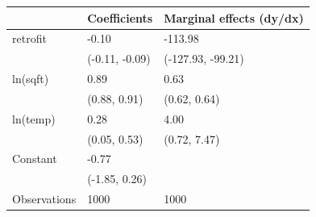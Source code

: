\begin{tabular}{lll}
\toprule
 & Coefficients & Marginal effects (dy/dx) \\
\midrule
retrofit & -0.10 & -113.98 \\
  & (-0.11, -0.09) & (-127.93, -99.21) \\
ln(sqft) & 0.89 & 0.63 \\
  & (0.88, 0.91) & (0.62, 0.64) \\
ln(temp) & 0.28 & 4.00 \\
  & (0.05, 0.53) & (0.72, 7.47) \\
Constant & -0.77 &   \\
  & (-1.85, 0.26) &   \\
Observations & 1000 & 1000 \\
\bottomrule
\end{tabular}
